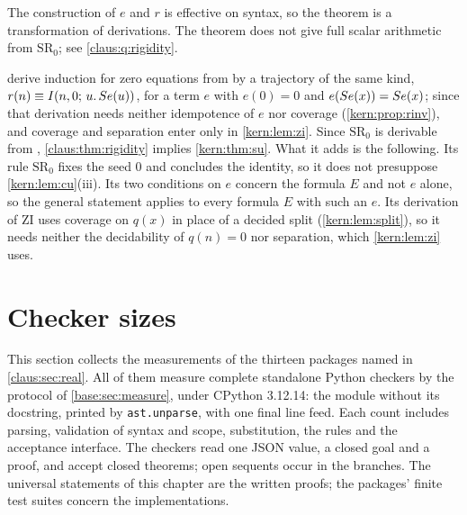 The construction of $e$ and $r$ is effective on syntax, so the theorem
is a transformation of derivations. The theorem does not give full
scalar arithmetic from $\mathrm{SR}_0$; see \cref{claus:q:rigidity}.

\begin{remark}
\label{claus:rem:rigidity}
derive induction for zero equations from  by a trajectory of
the same kind, $r(n)\equiv I(n,0;\,u.\,S e(u))$, for a term $e$ with
$e(0)=0$ and $e(S e(x))=S e(x)$; since  that
derivation needs neither idempotence of $e$ nor coverage
(\cref{kern:prop:rinv}), and coverage and separation enter only in
\cref{kern:lem:zi}. Since $\mathrm{SR}_0$ is derivable from
, \cref{claus:thm:rigidity} implies \cref{kern:thm:su}.
What it adds is the following. Its rule $\mathrm{SR}_0$ fixes the seed $0$
and concludes the identity, so it does not presuppose
\cref{kern:lem:cu}(iii). Its two conditions on $e$ concern the formula $E$
and not $e$ alone, so the general statement applies to every formula $E$
with such an $e$. Its derivation of $\mathrm{ZI}$ uses coverage on $q(x)$
in place of a decided split (\cref{kern:lem:split}), so it needs neither
the decidability of $q(n)=0$ nor separation, which \cref{kern:lem:zi}
uses.
\end{remark}

\section{Checker sizes}
\label{claus:sec:checkers}

This section collects the measurements of the thirteen packages named in
\cref{claus:sec:real}. All of them measure complete standalone Python
checkers by the protocol of \cref{base:sec:measure}, under CPython
3.12.14: the module without its
docstring, printed by \texttt{ast.unparse}, with one final line feed.
Each count includes parsing, validation of syntax and scope, substitution,
the rules and the acceptance interface. The checkers read one JSON value,
a closed goal and a proof, and accept closed theorems; open sequents occur
in the branches. The universal statements of this chapter are the written
proofs; the packages' finite test suites concern the implementations.

